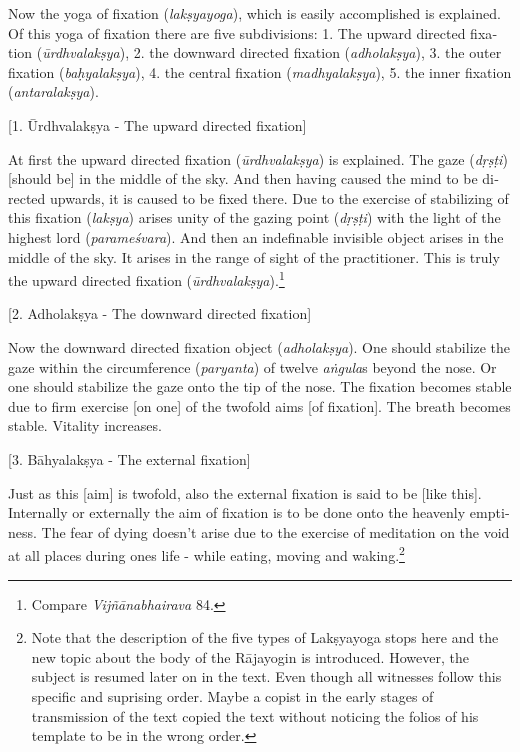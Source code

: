 \begin{otherlanguage}{english}
    \bigskip
 \begin{tlate}
   Now the yoga of fixation (\textit{lakṣyayoga}), which is easily accomplished is explained. Of this yoga of fixation there are five subdivisions:
   1. The upward directed fixation (\textit{ūrdhvalakṣya}),
   2. the downward directed fixation (\textit{adholakṣya}),
   3. the outer fixation (\textit{baḥyalakṣya}),
   4. the central fixation (\textit{madhyalakṣya}),
   5. the inner fixation (\textit{antaralakṣya}).
 \end{tlate}
     \bigskip
    \centerline{\textrm{\small{[1. Ūrdhvalakṣya - The upward directed fixation]}}}
    \bigskip    
  \begin{tlate}
At first the upward directed fixation (\textit{ūrdhvalakṣya}) is explained. The gaze (\textit{dṛṣṭi}) [should be] in the middle of the sky. And then having caused the mind to be directed upwards, it is caused to be fixed there. Due to the exercise of stabilizing of this fixation (\textit{lakṣya}) arises unity of the gazing point (\textit{dṛṣṭi}) with the light of the highest lord (\textit{parameśvara}). And then an indefinable invisible object arises in the middle of the sky. It arises in the range of sight of the practitioner. This is truly the upward directed fixation (\textit{ūrdhvalakṣya}).\footnote{Compare \textit{Vijñānabhairava} 84.} 
  \end{tlate}
   \bigskip
    \centerline{\textrm{\small{[2. Adholakṣya - The downward directed fixation]}}}
    \bigskip
  \begin{tlate}
    Now the downward directed fixation object (\textit{adholakṣya}). One should stabilize the gaze within the circumference (\textit{paryanta}) of twelve \textit{aṅgula}s beyond the nose. Or one should stabilize the gaze onto the tip of the nose. The fixation becomes stable due to firm exercise [on one] of the twofold aims [of fixation]. The breath becomes stable. Vitality increases.
\end{tlate}
   \bigskip
    \centerline{\textrm{\small{[3. Bāhyalakṣya - The external fixation]}}}
    \bigskip
  \begin{tlate}
    Just as this [aim] is twofold, also the external fixation is said to be [like this]. Internally or externally the aim of fixation is to be done onto the heavenly emptiness. The fear of dying doesn't arise due to the exercise of meditation on the void at all places during ones life - while eating, moving and waking.\footnote{Note that the description of the five types of Lakṣyayoga stops here and the new topic about the body of the Rājayogin is introduced. However, the subject is resumed later on in the text. Even though all witnesses follow this specific and suprising order. Maybe a copist in the early stages of transmission of the text copied the text without noticing the folios of his template to be in the wrong order.}

\end{tlate}
\end{otherlanguage}
